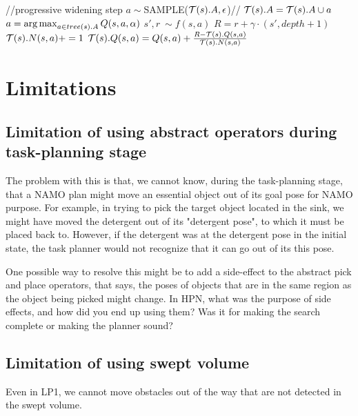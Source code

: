 \documentclass[10pt,letterpaper]{article}
\begin{document}
\begin{algorithm}[htb]
\small
   \caption{($s, T, \delta, \alpha, \epsilon, S_G$)}
   \label{alg:simulate}
\begin{algorithmic}[1]
 
\ENDIF
{}
\STATE //progressive widening step
\STATE $a \sim ${\sc SAMPLE}($\mathcal{T}(s).A, \epsilon$)// 
\STATE $\mathcal{T}(s).A = \mathcal{T}(s).A \cup a$
\ELSE
\STATE $a = \operatorname{arg\,max}_{a \in tree(s).A} Q(s,a, \alpha)$
\ENDIF
{}
 
\ENDIF
\STATE $s',r ~ \sim f(s,a)$
\STATE $R = r + \gamma \cdot $$(s',depth+1)$
\STATE $\mathcal{T}(s).N(s,a) += 1$
\STATE $\mathcal{T}(s).Q(s,a) = Q(s,a) + \frac{R-\mathcal{T}(s).Q(s,a)}{\mathcal{T}(s).N(s,a)}$
\end{algorithmic}
\end{algorithm}

\section{Limitations}
\subsection{Limitation of using abstract operators during task-planning stage}
The problem with this is that, we cannot know, during the 
task-planning stage, that a NAMO plan might move an 
essential object out of its goal pose for NAMO purpose. 
For example, in trying to pick the target object located 
in the sink, we might have moved the detergent out of its 
"detergent pose", to which it must be placed back to. However, 
if the detergent was at the detergent pose in the initial state, 
the task planner would not recognize that it can go out of its this pose.

One possible way to resolve this might be to add a side-effect to the 
abstract pick and place operators, that says, the poses of objects 
that are in the same region as the object being picked might change. 
In HPN, what was the purpose of side effects, and how did you end 
up using them? Was it for making the search complete or making the planner sound?

\subsection{Limitation of using swept volume}
Even in LP1, we cannot move obstacles out of the way that are not detected in
the swept volume.
\end{document}
